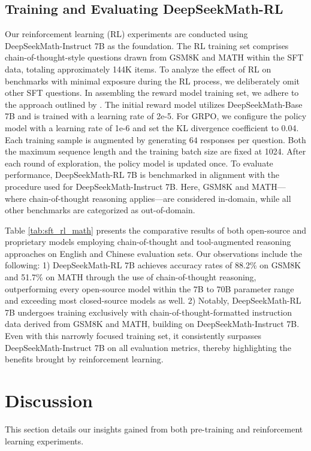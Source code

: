 \begin{itemize}[topsep=0pt]
\subsection{Training and Evaluating DeepSeekMath-RL}

Our reinforcement learning (RL) experiments are conducted using DeepSeekMath-Instruct 7B as the foundation. The RL training set comprises chain-of-thought-style questions drawn from GSM8K and MATH within the SFT data, totaling approximately 144K items. To analyze the effect of RL on benchmarks with minimal exposure during the RL process, we deliberately omit other SFT questions. In assembling the reward model training set, we adhere to the approach outlined by \citep{wang2023math}. The initial reward model utilizes DeepSeekMath-Base 7B and is trained with a learning rate of 2e-5. For GRPO, we configure the policy model with a learning rate of 1e-6 and set the KL divergence coefficient to 0.04. Each training sample is augmented by generating $64$ responses per question. Both the maximum sequence length and the training batch size are fixed at 1024. After each round of exploration, the policy model is updated once. To evaluate performance, DeepSeekMath-RL 7B is benchmarked in alignment with the procedure used for DeepSeekMath-Instruct 7B. Here, GSM8K and MATH—where chain-of-thought reasoning applies—are considered in-domain, while all other benchmarks are categorized as out-of-domain.

Table \ref{tab:sft_rl_math} presents the comparative results of both open-source and proprietary models employing chain-of-thought and tool-augmented reasoning approaches on English and Chinese evaluation sets. Our observations include the following: 1) DeepSeekMath-RL 7B achieves accuracy rates of 88.2\% on GSM8K and 51.7\% on MATH through the use of chain-of-thought reasoning, outperforming every open-source model within the 7B to 70B parameter range and exceeding most closed-source models as well. 2) Notably, DeepSeekMath-RL 7B undergoes training exclusively with chain-of-thought-formatted instruction data derived from GSM8K and MATH, building on DeepSeekMath-Instruct 7B. Even with this narrowly focused training set, it consistently surpasses DeepSeekMath-Instruct 7B on all evaluation metrics, thereby highlighting the benefits brought by reinforcement learning.

\section{Discussion}
This section details our insights gained from both pre-training and reinforcement learning experiments.


\end{itemize}
